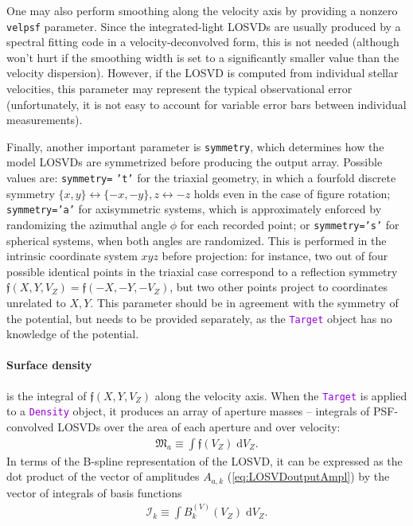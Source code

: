 \documentclass[12pt]{article}
\newcommand{\ttt}[1]{\textcolor{darkviolet}{\texttt{#1}}}
\newcommand{\ppp}[1]{\textcolor{darkolive} {\texttt{#1}}}
\renewcommand{\d}{\mathrm{d}}
\begin{document}
One may also perform smoothing along the velocity axis by providing a nonzero \ppp{velpsf} parameter. Since the integrated-light LOSVDs  are usually produced by a spectral fitting code in a velocity-deconvolved form, this is not needed (although won't hurt if the smoothing width is set to a significantly smaller value than the velocity dispersion). However, if the LOSVD is computed from individual stellar velocities, this parameter may represent the typical observational error (unfortunately, it is not easy to account for variable error bars between individual measurements).

Finally, another important parameter is \ppp{symmetry}, which determines how the model LOSVDs are symmetrized before producing the output array. Possible values are: \ppp{symmetry=} \ppp{'t'} for the triaxial geometry, in which a fourfold discrete symmetry $\{x,y\}\leftrightarrow \{-x,-y\}, z \leftrightarrow -z$ holds even in the case of figure rotation; \ppp{symmetry='a'} for axisymmetric systems, which is approximately enforced by randomizing the azimuthal angle $\phi$ for each recorded point; or \ppp{symmetry='s'} for spherical systems, when both angles are randomized. This is performed in the intrinsic coordinate system $xyz$ before projection: for instance, two out of four possible identical points in the triaxial case correspond to a reflection symmetry $\mathfrak{f}(X,Y,V_Z) = \mathfrak{f}(-X,-Y,-V_Z)$, but two other points project to coordinates unrelated to $X,Y$. This parameter should be in agreement with the symmetry of the potential, but needs to be provided separately, as the \ttt{Target} object has no knowledge of the potential.

\paragraph{Surface density} is the integral of $\mathfrak{f}(X,Y,V_Z)$ along the velocity axis. When the \ttt{Target} is applied to a \ttt{Density} object, it produces an array of aperture masses -- integrals of PSF-convolved LOSVDs over the area of each aperture and over velocity:
\begin{align}  \label{eq:ApertureMass}
\mathfrak M_a \equiv \int \mathfrak{f}(V_Z)\; \d V_Z .
\end{align}
In terms of the B-spline representation of the LOSVD, it can be expressed as the dot product of the vector of amplitudes $A_{a,k}$ (\ref{eq:LOSVDoutputAmpl}) by the vector of integrals of basis functions
\begin{align}  \label{eq:BsplineIntegrals}
\mathcal I_k \equiv \int B_k^{(V)}(V_Z)\; \d V_Z .
\end{align}
\end{document}
